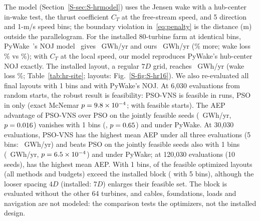 The model (Section~\ref{S-sec:S-hrmodel}) uses the Jensen wake with a hub-center in-wake test, the thrust coefficient $C_T$ at the free-stream speed, and 5\textdegree{} direction and 1-m/s speed bins; the boundary violation in~\eqref{eq:penalty} is the distance (m) outside the parallelogram. For the installed 80-turbine farm at identical bins, PyWake~\NFPyWakeVersion's NOJ model~\cite{PyWake} gives \NFPyWakeAEP~GWh/yr and ours \NFPyWakeOurAEP~GWh/yr (\NFPyWakeDiffPct\% more; wake loss \NFPyWakeOurLossPct\% vs \NFPyWakeLossPct\%); with $C_T$ at the local speed, our model reproduces PyWake's hub-center NOJ exactly. The installed layout, a regular $7D$ grid, reaches \NHRInstalled~GWh/yr (wake loss \NHRInstalledLoss\%; Table~\ref{tab:hr-site}; layouts: Fig.~\ref{S-fig:S-hr16}). We also re-evaluated all final layouts with 1\textdegree{} bins and with PyWake's NOJ. At 6,030 evaluations from random starts, the robust result is feasibility: PSO-VNS is feasible in \NHRFeasPSOVNS{} runs, PSO in only \NHRFeasPSO{} (exact McNemar $p=9.8\times10^{-4}$; \NHRFeasFeasInitPSO{} with feasible starts). The AEP advantage of PSO-VNS over PSO on the \NFHRPairSixKOneN{} jointly feasible seeds (\NFHRPairSixKFive~GWh/yr, $p=0.016$) vanishes with 1\textdegree{} bins (\NFHRPairSixKOne, $p=0.65$) and under PyWake. At 30,030 evaluations, PSO-VNS has the highest mean AEP under all three evaluations (5\textdegree{} bins: \NHRMeanThirtyKPSOVNS~GWh/yr) and beats PSO on the \NFHRPairThirtyKOneN{} jointly feasible seeds also with 1\textdegree{} bins (\NFHRPairThirtyKOne~GWh/yr, $p=6.5\times10^{-4}$) and under PyWake; at 120,030 evaluations (10 seeds), \NHRBestHundredTwentyK{} has the highest mean AEP. With 1\textdegree{} bins, \NFHRAboveOneTotal{} of the \NFHRNFeas{} feasible optimized layouts (all methods and budgets) exceed the installed block (\NFHRAboveFiveTotal{} with 5\textdegree{} bins), although the looser spacing $4D$ (installed: $7D$) enlarges their feasible set. The block is evaluated without the other 64 turbines, and cables, foundations, loads and navigation are not modeled: the comparison tests the optimizers, not the installed design.
